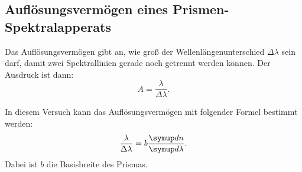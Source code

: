 \subsection{Auflösungsvermögen eines Prismen-Spektralapperats}

Das Auflösungsvermögen gibt an, wie groß der Wellenlängenunterschied $\Delta\lambda$ sein darf, damit
zwei Spektrallinien gerade noch getrennt werden können. Der Ausdruck ist dann:
\begin{equation*}
  A = \frac{\lambda}{\Delta\lambda}.
\end{equation*}

In diesem Versuch kann das Auflösungsvermögen mit folgender Formel bestimmt werden:
\begin{equation}
  \frac{\lambda}{\Delta\lambda} = b \frac{\g{d}n}{\g{d}\lambda}.
\end{equation}
Dabei ist $b$ die Basisbreite des Prismas.


\cite{anleitung}
